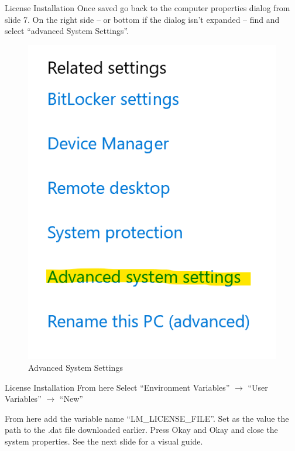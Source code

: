 \documentclass[fleqn]{beamer}
\newcommand{\quotes}[1]{``#1''}
\begin{document}
\begin{frame}{License Installation}
   Once saved go back to the computer properties dialog from slide 7. On the right side -- or bottom if the dialog isn't expanded -- find and select \quotes{advanced System Settings}.
   \begin{figure}
       \centering
       \includegraphics[scale=.5]{figures/advancedsettings.png}
       \caption{Advanced System Settings}
       \label{fig:my_label}
   \end{figure}
\end{frame}
\begin{frame}{License Installation}
    From here Select \quotes{Environment Variables} $\longrightarrow$ \quotes{User Variables} $\longrightarrow$ \quotes{New}\par
    From here add the variable name \quotes{LM\_LICENSE\_FILE}. Set as the value the path to the .dat file downloaded earlier. Press Okay and Okay and close the system properties. See the next slide for a visual guide.
\end{frame}
\end{document}
